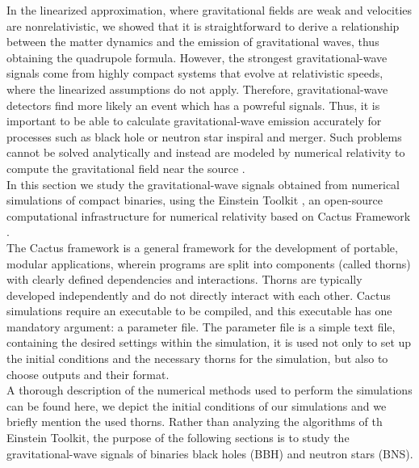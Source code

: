 In the linearized approximation, where gravitational fields are weak and velocities are nonrelativistic, we showed that it is straightforward to derive a relationship between the matter dynamics and the emission of gravitational waves, thus obtaining the quadrupole formula.
However, the strongest gravitational-wave signals come from highly compact systems that evolve at relativistic speeds, where the linearized assumptions do not apply. 
Therefore, gravitational-wave detectors find more likely an event which has a powreful signals.
Thus, it is important to be able to calculate gravitational-wave emission accurately for processes such as black hole or neutron star inspiral and merger.
Such problems cannot be solved analytically and instead are modeled by numerical relativity to compute the gravitational field near the source \cite{bishop_extraction_2016}.\\
In this section we study the gravitational-wave signals obtained from numerical simulations of compact binaries, using the Einstein Toolkit \cite{loffler_einstein_2012,EinsteinToolkit:web,EinsteinToolkit:ascl}, an open-source computational infrastructure for numerical relativity based on Cactus Framework \cite{noauthor_cactus_nodate}.\\
The Cactus framework is a general framework for the development of portable, modular applications, wherein programs are split into components (called thorns) with clearly defined dependencies and interactions. 
Thorns are typically developed independently and do not directly interact with each other. 
Cactus simulations require an executable to be compiled, and this executable has one mandatory argument: a parameter file.
The parameter file is a simple text file, containing the desired settings within the simulation, it is used not only to set up the initial conditions and the necessary thorns for the simulation, but also to choose outputs and their format.
\\
A thorough description of the numerical methods used to perform the simulations can be found here, we depict the initial conditions of our simulations and we briefly mention the used thorns.
Rather than analyzing the algorithms of th Einstein Toolkit, the purpose of the following sections is to study the gravitational-wave signals of binaries black holes (BBH) and neutron stars (BNS).
\\ 
